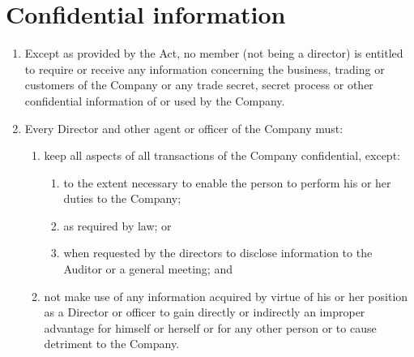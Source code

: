 \section{Confidential information}

\begin{enumerate}[label=(\alph*)]
    \item Except as provided by the Act, no member (not being a director) is entitled to require or receive any information concerning the business, trading or customers of the Company or any trade secret, secret process or other confidential information of or used by the Company.
    
    \item Every Director and other agent or officer of the Company must:
    \begin{enumerate}[label=(\roman*)]
        \item keep all aspects of all transactions of the Company confidential, except:
        \begin{enumerate}[label=(\Alph*)]
            \item to the extent necessary to enable the person to perform his or her duties to the Company;
            \item as required by law; or
            \item when requested by the directors to disclose information to the Auditor or a general meeting; and
        \end{enumerate}
        \item not make use of any information acquired by virtue of his or her position as a Director or officer to gain directly or indirectly an improper advantage for himself or herself or for any other person or to cause detriment to the Company.
    \end{enumerate}
\end{enumerate} 